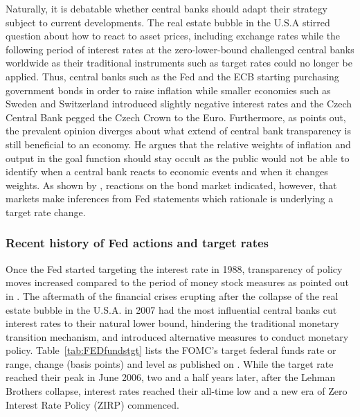 Naturally, it is debatable whether central banks should adapt their strategy subject to current developments. The real estate bubble in the U.S.A stirred question about how to react to asset prices, including exchange rates while the following period of interest rates at the zero-lower-bound challenged central banks worldwide as their traditional instruments such as target rates could no longer be applied. Thus, central banks such as the Fed and the ECB starting purchasing government bonds in order to raise inflation while smaller economies such as Sweden and Switzerland introduced slightly negative interest rates and the Czech Central Bank pegged the Czech Crown to the Euro. Furthermore, as \textcite{Mishkin.2007} points out, the prevalent opinion diverges about what extend of central bank transparency is still beneficial to an economy. He argues that the relative weights of inflation and output in the goal function should stay occult as the public would not be able to identify when a central bank reacts to economic events and when it changes weights. As shown by \textcite{Ellingsen.2001}, reactions on the bond market indicated, however, that markets make inferences from Fed statements which rationale is underlying a target rate change. %


\subsubsection{Recent history of Fed actions and target rates}

Once the Fed started targeting the interest rate in 1988, transparency of policy moves increased compared to the period of money stock measures as pointed out in \textcite{Ellingsen.2003}. The aftermath of the financial crises erupting after the collapse of the real estate bubble in the U.S.A. in 2007 had the most influential central banks cut interest rates to their natural lower bound, hindering the traditional monetary transition mechanism, and introduced alternative measures to conduct monetary policy. Table~\vref{tab:FEDfundstgt} lists the FOMC's target federal funds rate or range, change (basis points) and level as published on \textcite{Fed.OMOs}. While the target rate reached their peak in June 2006, two and a half years later, after the Lehman Brothers collapse, interest rates reached their all-time low and a new era of Zero Interest Rate Policy (ZIRP) commenced.

